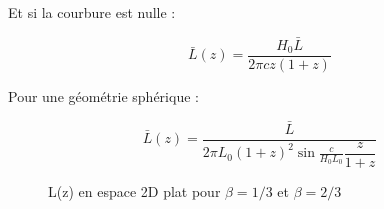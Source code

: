 \documentclass[11pt]{article} %
\begin{document}
Et si la courbure est nulle :

\begin{equation}
\bar{L} (z) = \dfrac{H_0 \bar{L}}{2\pi c z(1+z) }
\end{equation}

Pour une géométrie sphérique :

\begin{equation}
\bar{L} (z) = \dfrac{\bar{L}}{2\pi L_0(1+z)^2 \sin\frac{c}{H_0 L_0} \dfrac{z}{1+z}}
\end{equation}

\begin{figure}[H]
\centering
  \caption{L(z) en espace 2D plat pour $\beta = 1/3$ et $\beta = 2/3$}

\end{figure}
\end{document}

